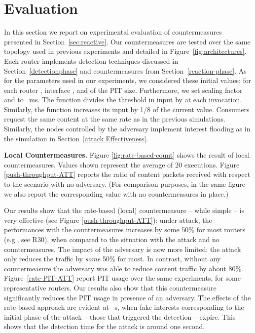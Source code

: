 \documentclass[10pt,conference,letterpaper]{IEEEtran}
\newcommand{\descr}[1]{\medskip\noindent\textbf{#1}}
\renewcommand{\paragraph}{\descr}
\begin{document}
\section{Evaluation}
\label{sec:evaluation}

In this section we report on experimental evaluation of countermeasures presented in Section~\ref{sec:reactive}.
Our countermeasures are tested over the same topology used in previous experiments and detailed in Figure~\ref{fig:architectures}. Each router implements detection techniques discussed in Section~\ref{detectionphase} and countermeasures from Section~\ref{reaction-phase}.
As for the parameters used in our experiments, we considered these initial values: for each router , interface ,  and  of the PIT size. 
Furthermore, we set scaling factor  and  to ~ms. 
The  function divides the threshold in input by  at each invocation. Similarly, the  function increases its input by 1/8 of the current value.
Consumers request the same content at the same rate as in the previous simulations. Similarly, the nodes controlled by the adversary implement interest flooding as in the simulation in Section~\ref{attack Effectiveness}. 



\paragraph{Local Countermeasures.} Figure \ref{fig:rate-based-count} shows the result of local countermeasures. Values shown represent the average of 20 executions.
Figure \ref{push-throughput-ATT} reports the ratio of content packets received with respect to the scenario with no adversary. (For comparison purposes, in the same figure we also report the corresponding value with no countermeasures in place.) 






Our results show that the rate-based (local) countermeasure -- while simple -- is very effective (see Figure \ref{push-throughput-ATT}): under attack, the performances with the countermeasures increases by some 50\%  for most routers (e.g., see R30), when compared to the situation with the attack and no countermeasures.
The impact of the adversary  is now more limited: the attack only reduces the traffic by {\em some} 50\% for most. In contrast, without any countermeasure the adversary was able to reduce content traffic by about 80\%.
Figure~\ref{rate-PIT-ATT} report PIT usage over the same experiments, for some representative routers.
Our results also show that this countermeasure significantly reduces the PIT usage in presence of an adversary. The effects of the rate-based approach are evident at ~s, when fake interests corresponding to the initial phase of the attack -- those that triggered the detection  -- expire. This shows that the detection time for the attack is around one second. 
\end{document}
